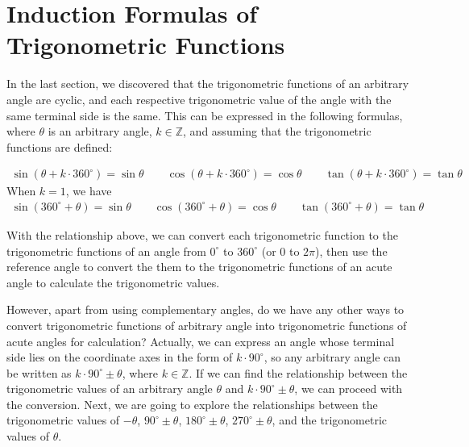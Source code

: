 \documentclass{report}
\begin{document}
\newpage

\section{Induction Formulas of Trigonometric Functions}

In the last section, we discovered that the trigonometric functions of an arbitrary angle are cyclic, and each respective trigonometric value of the angle with the same terminal side is the same. This can be expressed in the following formulas, where $\theta$ is an arbitrary angle, $k \in \mathbb{Z}$, and assuming that the trigonometric functions are defined:

\begin{info}
    \begin{align*}
        \sin(\theta + k \cdot 360^\circ) = \sin \theta \qquad \cos(\theta + k \cdot 360^\circ) = \cos \theta \qquad \tan(\theta + k \cdot 360^\circ) = \tan \theta 
    \end{align*}
    \noindent When $k = 1$, we have
    \begin{align*}
        \sin(360^\circ + \theta) = \sin \theta \qquad \cos(360^\circ + \theta) = \cos \theta \qquad \tan(360^\circ + \theta) = \tan \theta
    \end{align*}
\end{info}
With the relationship above, we can convert each trigonometric function to the trigonometric functions of an angle from $0^\circ$ to $360^\circ$ (or $0$ to $2\pi$), then use the reference angle to convert the them to the trigonometric functions of an acute angle to calculate the trigonometric values.

However, apart from using complementary angles, do we have any other ways to convert trigonometric functions of arbitrary angle into trigonometric functions of acute angles for calculation? Actually, we can express an angle whose terminal side lies on the coordinate axes in the form of $k \cdot 90^{\circ}$, so any arbitrary angle can be written as $k \cdot 90^{\circ} \pm \theta$, where $k \in \mathbb{Z}$. If we can find the relationship between the trigonometric values of an arbitrary angle $\theta$ and $k \cdot 90^{\circ} \pm \theta$, we can proceed with the conversion. Next, we are going to explore the relationships between the trigonometric values of $-\theta$, $90^{\circ} \pm \theta$, $180^{\circ} \pm \theta$, $270^{\circ} \pm \theta$, and the trigonometric values of $\theta$.
\end{document}
